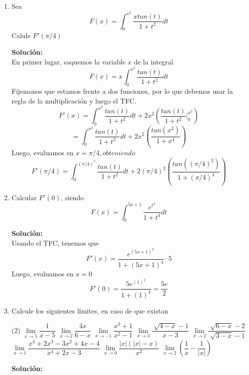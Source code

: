 \documentclass[12pt]{article}
\newenvironment{solucion}
{\begin{mdframed}[backgroundcolor=black!10]
		{\bf Solución:}\\
	}
	{
	\end{mdframed}
}
\newenvironment{preguntas}
{\begin{enumerate}\itemsep12pt
	}
	{
	\end{enumerate}
}
\newcommand{\ev}{\Big|}
\newcommand{\ra}{\rightarrow}
\begin{document}
\begin{preguntas}
\begin{solucion}
\begin{enumerate}[a)]
\item $\displaystyle\int (3x^2 + 2x + 1)dx = \displaystyle\int 3x^2dx + \displaystyle\int 2xdx + \displaystyle\int dx  = 3\displaystyle\int x^2dx + 2\displaystyle\int xdx + \displaystyle\int dx $
			$$= 3\dfrac{x^3}{3} + 2\dfrac{x^2}{2} + x + c = x^3 + x^2 + x + c$$
\item $\displaystyle\int x(x+1)(x+2)dx = \displaystyle\int (x^3+3x^2+2x)dx = \dfrac{x^4}{4}+x^3+x+c$
\item $\displaystyle\int sen^2(x)dx = \displaystyle\int \dfrac{1-cos(2x)}{2}dx = \displaystyle\int \dfrac{1}{2}dx - \displaystyle\int \dfrac{cos(2x)}{2} = \dfrac{x}{2} -\dfrac{sen(2x)}{4} + c$
\item $\displaystyle\int (1+e)^xdx = \dfrac{(1+e)^x}{ln(1+e)}$
\end{enumerate}
\end{solucion}
\item Sea
$$F(x) = \displaystyle\int_0^{x^2} \dfrac{xtan(t)}{1+t^2}dt$$
	Calule $F'(\pi /4)$
\begin{solucion}
En primer lugar, saquemos la variable $x$ de la integral
		$$F(x) = x\displaystyle\int_0^{x^2} \dfrac{tan(t)}{1+t^2}dt$$
		Fijemonos que estamos frente a dos funciones, por lo que debemos usar la regla de la multiplicación y luego el TFC.
		$$F'(x) = \displaystyle\int_0^{x^2} \dfrac{tan(t)}{1+t^2}dt + 2x^2\left(\dfrac{tan(t)}{1+t^2}\ev_0^{x^2}\right)$$
		$$= \displaystyle\int_0^{x^2} \dfrac{tan(t)}{1+t^2}dt + 2x^2\left(\dfrac{tan(x^2)}{1+x^4}\right)$$
		Luego, evaluamos en $x = \pi /4, obteniendo$
		$$F'(\pi /4) = \displaystyle\int_0^{(\pi /4)^2} \dfrac{tan(t)}{1+t^2}dt + 2(\pi /4)^2\left(\dfrac{tan((\pi /4)^2)}{1+(\pi /4)^4}\right)$$
\end{solucion}
\item Calcular $F'(0)$, siendo
	$$F(x) = \displaystyle\int_0^{5x+1} \dfrac{e^{t^2}}{1+t^4}dt$$
\begin{solucion}
Usando el TFC, tenemos que
		$$F'(x) = \dfrac{e^{(5x+1)^2}}{1+(5x+1)^4} \cdot 5$$
		Luego, evaluamos en $x=0$
		$$F'(0) = \dfrac{5e^{(1)^2}}{1+(1)^4} = \dfrac{5e}{2}$$
\end{solucion}
\item Calcule los siguientes límites, en caso de que existan
\begin{tasks}(2)
\task $\lim\limits_{x \ra 5} \dfrac{1}{x-5}$ 
\task $\lim\limits_{x \ra 2} \dfrac{4x}{6-x}$
\task $\lim\limits_{x \ra -1} \dfrac{x^3+1}{x^2-1}$
\task $\lim\limits_{x \ra 3} \dfrac{\sqrt[]{4-x}-1}{x-3}$
\task $\lim\limits_{x \ra 2} \dfrac{\sqrt[]{6-x}-2}{\sqrt[]{3-x}-1}$
\task $\lim\limits_{x \ra 1} \dfrac{x^4+2x^3-3x^2+4x-4}{x^4+2x-3}$
\task $\lim\limits_{x \ra 0} \dfrac{|x|(|x|-x)}{x^2}$
\task $\lim\limits_{x \ra 2}\left(\dfrac{1}{x}-\dfrac{1}{|x|}\right)$
\end{tasks}
\begin{solucion}


\end{solucion}
\end{preguntas}
\end{document}
